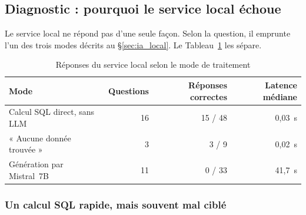 \subsection{Diagnostic : pourquoi le service local échoue}
\label{sec:bench_diagnostic}

Le service local ne répond pas d'une seule façon. Selon la question, il emprunte l'un des trois modes décrits au §\ref{sec:ia_local}. Le Tableau~\ref{tab:bench_modes_local} les sépare.

\begin{table}[htbp]
\centering
\footnotesize
\caption{Réponses du service local selon le mode de traitement}
\label{tab:bench_modes_local}
\begin{tabular}{|l|r|r|r|}
\hline
\rowcolor[HTML]{EFEFEF}
\textbf{Mode} & \textbf{Questions} & \textbf{Réponses correctes} & \textbf{Latence médiane} \\ \hline
Calcul SQL direct, sans LLM & 16 & 15 / 48 & 0,03~s \\ \hline
« Aucune donnée trouvée » & 3 & 3 / 9 & 0,02~s \\ \hline
Génération par Mistral~7B & 11 & 0 / 33 & 41,7~s \\ \hline
\end{tabular}
\end{table}

\subsubsection{Un calcul SQL rapide, mais souvent mal ciblé}

